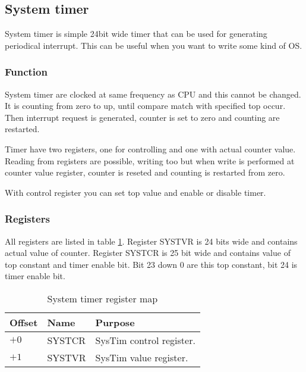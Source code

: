 \subsection{System timer}

System timer is simple 24bit wide timer that can be used for generating
periodical interrupt. This can be useful when you want to write some kind of
OS.

\subsubsection{Function}

System timer are clocked at same frequency as CPU and this cannot be changed. It
is counting from zero to up, until compare match with specified top occur. Then
interrupt request is generated, counter is set to zero and counting are restarted.

Timer have two registers, one for controlling and one with actual counter value. Reading
from registers are possible, writing too but when write is performed at counter
value register, counter is reseted and counting is restarted from zero.

With control register you can set top value and enable or disable timer.

\subsubsection{Registers}

All registers are listed in table \ref{tab:systim_reg_map}. Register SYSTVR is 24
bits wide and  contains  actual value of counter. Register SYSTCR is 25 bit wide
and contains value of top constant and timer enable bit. Bit 23 down 0 are this
top constant, bit 24 is timer enable bit.

\begin{table}[h]
    \centering
    \begin{tabular}{|l|l|l|}
        \hline
        \textbf{Offset} & \textbf{Name} & \textbf{Purpose}            \\ \hline
        $+0$            & SYSTCR        & SysTim control register.    \\ \hline
        $+1$            & SYSTVR        & SysTim value register.      \\ \hline
    \end{tabular}
    \caption{System timer register map}
    \label{tab:systim_reg_map}
\end{table}

